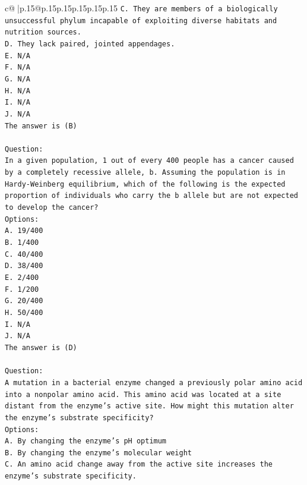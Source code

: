 \documentclass{article}
\begin{document}
{\begin{supertabular}{c@{$\;$}|p{.15\linewidth}@{}p{.15\linewidth}p{.15\linewidth}p{.15\linewidth}p{.15\linewidth}p{.15\linewidth}}
{{{\texttt{C. They are members of a biologically unsuccessful phylum incapable of exploiting diverse habitats and nutrition sources.} \\
\texttt{D. They lack paired, jointed appendages.} \\
\texttt{E. N/A} \\
\texttt{F. N/A} \\
\texttt{G. N/A} \\
\texttt{H. N/A} \\
\texttt{I. N/A} \\
\texttt{J. N/A} \\
\texttt{The answer is (B)} \\
\\ 
\texttt{Question:} \\
\texttt{In a given population, 1 out of every 400 people has a cancer caused by a completely recessive allele, b. Assuming the population is in Hardy{-}Weinberg equilibrium, which of the following is the expected proportion of individuals who carry the b allele but are not expected to develop the cancer?} \\
\texttt{Options:} \\
\texttt{A. 19/400} \\
\texttt{B. 1/400} \\
\texttt{C. 40/400} \\
\texttt{D. 38/400} \\
\texttt{E. 2/400} \\
\texttt{F. 1/200} \\
\texttt{G. 20/400} \\
\texttt{H. 50/400} \\
\texttt{I. N/A} \\
\texttt{J. N/A} \\
\texttt{The answer is (D)} \\
\\ 
\texttt{Question:} \\
\texttt{A mutation in a bacterial enzyme changed a previously polar amino acid into a nonpolar amino acid. This amino acid was located at a site distant from the enzyme’s active site. How might this mutation alter the enzyme’s substrate specificity?} \\
\texttt{Options:} \\
\texttt{A. By changing the enzyme’s pH optimum} \\
\texttt{B. By changing the enzyme's molecular weight} \\
\texttt{C. An amino acid change away from the active site increases the enzyme's substrate specificity.} \\
}}}
\end{supertabular}}
\end{document}
